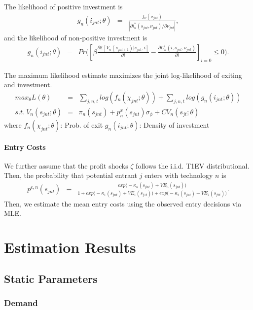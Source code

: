 \documentclass[12pt]{article}
\begin{document}
The likelihood of positive investment is
\begin{eqnarray}
    g_n(i_{jnt};\theta) &=& \frac{f_\nu(\nu_{jnt})}{|\partial i_n^*(s_{jnt},\nu_{jnt}) /\partial \nu_{jnt}|},
\end{eqnarray}
and the likelihood of non-positive investment is
\begin{eqnarray}
    g_n(i_{jnt};\theta) &=& Pr\Big( [\beta\frac{\partial \mathbb{E}[V_n(s_{jnt+1})|s_{jnt},i]}{\partial i} - \frac{\partial C_n^i(i,s_{jnt},\nu_{jnt})}{\partial i}]_{i=0} \leq 0  \Big).
\end{eqnarray}

The maximum likelihood estimate maximizes the joint log-likelihood of exiting and investment.   
\begin{eqnarray}
        max_\theta L(\theta) & = & \sum_{j,n,t} log(f_n(\chi_{jnt};\theta)) + \sum_{j,n,t} log(g_n(i_{jnt};\theta)) \nonumber \\
        s.t. \ V_n(s_{jnt};\theta) & = & \pi_n(s_{jnt}) + p_n^x(s_{jnt}) \sigma_\phi + CV_n(s_{jt};\theta)  \nonumber
\end{eqnarray}
where $f_n(\chi_{jnt};\theta)$: Prob. of exit
$g_n(i_{jnt};\theta)$: Density of investment


\paragraph{Entry Costs}
We further assume that the profit shocks $\zeta$ follows the i.i.d. T1EV distributional. Then, the probability that potential entrant $j$ enters with technology $n$ is
\begin{eqnarray*}
  p^{e,n}(s_{jnt}) & \equiv & \frac{exp\Big(-\kappa_n(s_{jnt}) + VE_n(s_{jnt}) \Big)}{1 + exp\Big(-\kappa_1(s_{jnt}) + VE_1(s_{j1t})\Big) + exp\Big(-\kappa_2(s_{jnt}) + VE_2(s_{j2t})\Big)}. %
\end{eqnarray*}
Then, we estimate the mean entry costs using the observed entry decisions via MLE.


\section{Estimation Results}


\subsection{Static Parameters}

\subsubsection{Demand}
\end{document}
